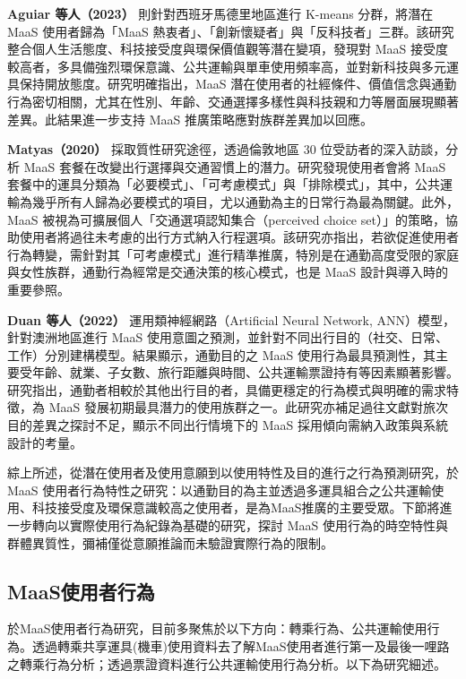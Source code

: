 \textbf{Aguiar 等人（2023）} 則針對西班牙馬德里地區進行 K-means
分群，將潛在 MaaS 使用者歸為「MaaS
熱衷者」、「創新懷疑者」與「反科技者」三群。該研究整合個人生活態度、科技接受度與環保價值觀等潛在變項，發現對
MaaS
接受度較高者，多具備強烈環保意識、公共運輸與單車使用頻率高，並對新科技與多元運具保持開放態度。研究明確指出，MaaS
潛在使用者的社經條件、價值信念與通勤行為密切相關，尤其在性別、年齡、交通選擇多樣性與科技親和力等層面展現顯著差異。此結果進一步支持
MaaS 推廣策略應對族群差異加以回應。

\textbf{Matyas（2020）} 採取質性研究途徑，透過倫敦地區 30
位受訪者的深入訪談，分析 MaaS
套餐在改變出行選擇與交通習慣上的潛力。研究發現使用者會將 MaaS
套餐中的運具分類為「必要模式」、「可考慮模式」與「排除模式」，其中，公共運輸為幾乎所有人歸為必要模式的項目，尤以通勤為主的日常行為最為關鍵。此外，MaaS
被視為可擴展個人「交通選項認知集合（perceived choice
set）」的策略，協助使用者將過往未考慮的出行方式納入行程選項。該研究亦指出，若欲促進使用者行為轉變，需針對其「可考慮模式」進行精準推廣，特別是在通勤高度受限的家庭與女性族群，通勤行為經常是交通決策的核心模式，也是
MaaS 設計與導入時的重要參照。

\textbf{Duan 等人（2022）} 運用類神經網路（Artificial Neural Network,
ANN）模型，針對澳洲地區進行 MaaS
使用意圖之預測，並針對不同出行目的（社交、日常、工作）分別建構模型。結果顯示，通勤目的之
MaaS
使用行為最具預測性，其主要受年齡、就業、子女數、旅行距離與時間、公共運輸票證持有等因素顯著影響。研究指出，通勤者相較於其他出行目的者，具備更穩定的行為模式與明確的需求特徵，為
MaaS
發展初期最具潛力的使用族群之一。此研究亦補足過往文獻對旅次目的差異之探討不足，顯示不同出行情境下的
MaaS 採用傾向需納入政策與系統設計的考量。

綜上所述，從潛在使用者及使用意願到以使用特性及目的進行之行為預測研究，於
MaaS
使用者行為特性之研究：以通勤目的為主並透過多運具組合之公共運輸使用、科技接受度及環保意識較高之使用者，是為MaaS推廣的主要受眾。下節將進一步轉向以實際使用行為紀錄為基礎的研究，探討
MaaS
使用行為的時空特性與群體異質性，彌補僅從意願推論而未驗證實際行為的限制。

\subsection{MaaS使用者行為}\label{maasux4f7fux7528ux8005ux884cux70ba}

於MaaS使用者行為研究，目前多聚焦於以下方向：轉乘行為、公共運輸使用行為。透過轉乘共享運具(機車)使用資料去了解MaaS使用者進行第一及最後一哩路之轉乘行為分析；透過票證資料進行公共運輸使用行為分析。以下為研究細述。

